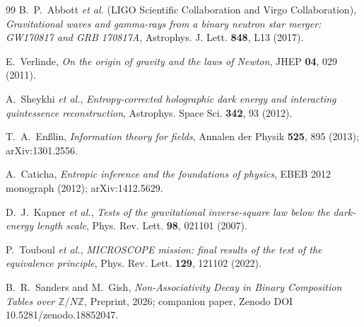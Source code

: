 \documentclass[11pt,reqno]{amsart}
\theoremstyle{plain}
\theoremstyle{definition}
\theoremstyle{remark}
\begin{document}
\begin{thebibliography}{99}
B.~P.~Abbott \emph{et al.} (LIGO Scientific Collaboration and Virgo Collaboration),
\emph{Gravitational waves and gamma-rays from a binary neutron star merger:
GW170817 and GRB 170817A},
Astrophys. J. Lett. \textbf{848}, L13 (2017).

E.~Verlinde,
\emph{On the origin of gravity and the laws of Newton},
JHEP \textbf{04}, 029 (2011).

A.~Sheykhi \emph{et al.},
\emph{Entropy-corrected holographic dark energy and interacting quintessence reconstruction},
Astrophys. Space Sci. \textbf{342}, 93 (2012).

T.~A.~En{\ss}lin,
\emph{Information theory for fields},
Annalen der Physik \textbf{525}, 895 (2013); arXiv:1301.2556.

A.~Caticha,
\emph{Entropic inference and the foundations of physics},
EBEB 2012 monograph (2012); arXiv:1412.5629.

D.~J.~Kapner \emph{et al.},
\emph{Tests of the gravitational inverse-square law below the dark-energy length scale},
Phys. Rev. Lett. \textbf{98}, 021101 (2007).

P.~Touboul \emph{et al.},
\emph{MICROSCOPE mission: final results of the test of the equivalence principle},
Phys. Rev. Lett. \textbf{129}, 121102 (2022).

B.~R.~Sanders and M.~Gish,
\emph{Non-Associativity Decay in Binary Composition Tables over $\mathbb{Z}/N\mathbb{Z}$},
Preprint, 2026; companion paper, Zenodo DOI 10.5281/zenodo.18852047.

\end{thebibliography}
\end{document}
